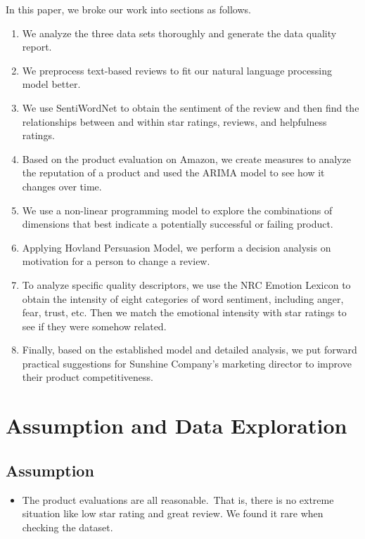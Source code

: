 \documentclass[12pt]{article}  %
\begin{document}
In this paper, we broke our work into sections as follows.
\begin{enumerate}[\bfseries 1.]
    \item  We analyze the three data sets thoroughly and generate the data quality report.
    
    
    \item  We preprocess text-based reviews to fit our natural language processing model better.
    
    
    \item  We use SentiWordNet to obtain the sentiment of the review and then find the relationships between and within star ratings, reviews, and helpfulness ratings.
    
    
    \item  Based on the product evaluation on Amazon, we create measures to analyze the reputation of a product and used the ARIMA model to see how it changes over time.
    
    \item We use a non-linear programming model to explore the combinations of dimensions that best indicate a potentially successful or failing product.
    
    
    \item  Applying Hovland Persuasion Model, we perform a decision analysis on motivation for a person to change a review.
    
    
    \item To analyze specific quality descriptors, we use the NRC Emotion Lexicon to obtain the intensity of eight categories of word sentiment, including anger, fear, trust, etc. Then we match the emotional intensity with star ratings to see if they were somehow related. 
    
    
    \item  Finally, based on the established model and detailed analysis, we put forward practical suggestions for Sunshine Company's marketing director to improve their product competitiveness.
    
   
    
\end{enumerate}

\section{Assumption and Data Exploration}
\subsection{Assumption}
\begin{itemize}
	\item The product evaluations are all reasonable. That is, there is no extreme situation like low star rating and great review. We found it rare when checking the dataset.
	
	
\end{itemize}
\end{document}
